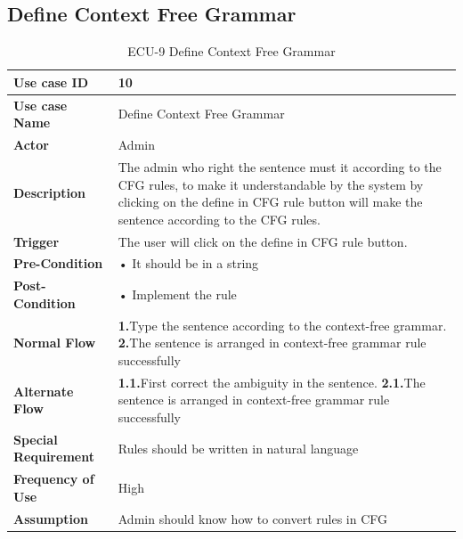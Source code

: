 \documentclass[12pt,a4paper]{article}
\begin{document}
\clearpage
     \subsection{Define Context Free Grammar}
    \begin{table}[h!]
\caption{ECU-9 Define Context Free Grammar}
    \centering
    \begin{tabular}{|l|p{10cm}|}
    \hline
       \textbf{Use case ID}&10 \\ %
       \hline
       \textbf{Use case Name}&Define Context Free Grammar \\ %
       \hline
       \textbf{Actor}&Admin \\ %
       \hline
       \textbf{Description}&The admin who right the sentence must it according to the CFG rules, to make it understandable by the system by clicking on the define in CFG rule button will make the sentence according to the CFG rules.\\ %
       \hline
       \textbf{Trigger}&The user will click on the define in CFG rule button. \\ %
        \hline
       \textbf{Pre-Condition}&
• It should be in a string\\ %
        \hline
       \textbf{Post-Condition}&• Implement the rule\\ %
        \hline
       \textbf{Normal Flow}&
    \textbf{1.}Type the sentence according to the context-free grammar.
\newline\textbf{2.}The sentence is arranged in context-free grammar rule successfully\\ %
\hline
       \textbf{Alternate Flow}&
       \textbf{1.1.}First correct the ambiguity in the sentence.
       \newline\textbf{2.1.}The sentence is arranged in context-free grammar rule successfully\\ %
        \hline
       \textbf{Special Requirement}&Rules should be written in natural language \\ %
        \hline
       \textbf{Frequency of Use}&High \\ %
        \hline
       \textbf{Assumption}&Admin should know how to convert rules in CFG\\ %
       \hline
    \end{tabular} 
    \end{table}

\clearpage
\end{document}
